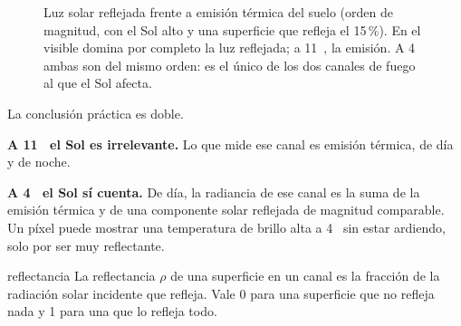 \begin{figure}[ht]
\centering
{}
\caption{Luz solar reflejada frente a emisión térmica del suelo (orden de magnitud, con el Sol
alto y una superficie que refleja el 15\,{}\%). En el visible domina por completo la luz
reflejada; a 11~\um, la emisión. A 4~\um{} ambas son del mismo orden: es el único de los dos
canales de fuego al que el Sol afecta.}
\label{fig:cruce}
\end{figure}

La conclusión práctica es doble.

\textbf{A 11~\um{} el Sol es irrelevante.} Lo que mide ese canal es emisión térmica, de día y de
noche.

\textbf{A 4~\um{} el Sol sí cuenta.} De día, la radiancia de ese canal es la suma de la emisión
térmica y de una componente solar reflejada de magnitud comparable. Un píxel puede mostrar una
temperatura de brillo alta a 4~\um{} sin estar ardiendo, solo por ser muy reflectante.

\begin{definicion}{reflectancia}
La reflectancia $\rho$ de una superficie en un canal es la fracción de la radiación solar
incidente que refleja. Vale 0 para una superficie que no refleja nada y 1 para una que lo
refleja todo.
\end{definicion}

